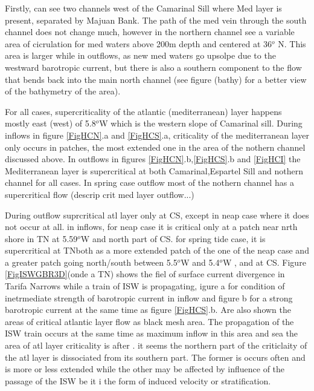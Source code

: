Firstly, can see two channels west of the Camarinal Sill where Med layer is present, separated by Majuan Bank. The path of the med vein through the south channel does not change much, however in the northern channel see a variable area of cicrulation for med waters above 200m depth and centered at 36$^o$ N. This area is larger while in outflows, as new med waters go upsolpe due to the westward barotropic current, but there is also a southern component to the flow that bends back into the main north channel (see figure (bathy) for a better view of the bathymetry of the area).

For all cases, supercriticality of the atlantic (mediterranean) layer happens mostly east (west) of 5.8$^o$W which is the western slope of Camarinal sill. During inflows in figure \ref{FigHCN}.a and \ref{FigHCS}.a, criticality of the mediterranean layer only occurs in patches, the most extended one in the area of the nothern channel discussed above. In outflows in figures \ref{FigHCN}.b,\ref{FigHCS}.b and \ref{FigHCI} the Mediterranean layer is supercritical at both Camarinal,Espartel Sill and nothern channel for all cases. In spring case outflow most of the nothern channel has a supercritical flow (descrip crit med layer outflow...)


During outflow suprcritical atl layer only at CS, except in neap case where it does not occur at all. in inflows, for neap case it is critical only at a patch near nrth shore in TN at 5.59$^o$W and north part of CS. for spring tide case, it is supercritical at TNboth as a more extended patch of the one of the neap case and a greater patch going north/south between 5.5$^o$W and 5.4$^o$W , and at CS. Figure \ref{FigISWGBR3D}(onde a TN) shows the fiel of surface current divergence in Tarifa Narrows while a train of ISW is propagating, igure a for condition of inetrmediate strength of barotropic current in inflow and figure b for a strong barotropic current at the same time as figure \ref{FigHCS}.b. Are also shown the areas of critical atlantic layer flow as black mesh area. The propagation of the ISW train occurs at the same time as maximum inflow in this area and sea the area of atl layer criticality is after . it seems the northern part of the criticlaity of the atl layer is dissociated from its southern part. The former is occurs often and is more or less extended while the other may be affected by influence of the passage of the ISW be it i the form of induced velocity or stratification.


